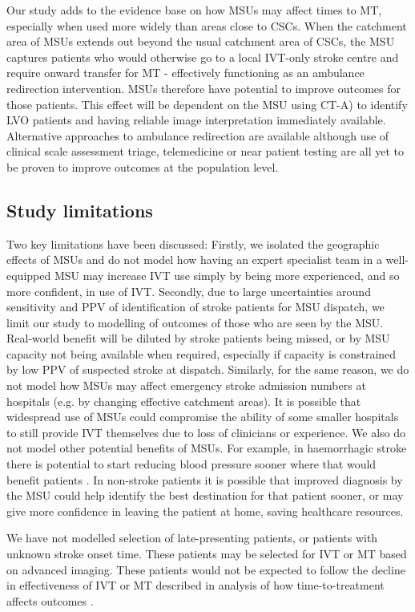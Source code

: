Our study adds to the evidence base on how MSUs may affect times to MT, especially when used more widely than areas close to CSCs. When the catchment area of MSUs extends out beyond the usual catchment area of CSCs, the MSU captures patients who would otherwise go to a local IVT-only stroke centre and require onward transfer for MT - effectively functioning as an ambulance redirection intervention. MSUs therefore have potential to improve outcomes for those patients. This effect will be dependent on the MSU using CT-A) to identify LVO patients and having reliable image interpretation immediately available. Alternative approaches to ambulance redirection are available although use of clinical scale assessment triage, telemedicine or near patient testing are all yet to be proven to improve outcomes at the population level.

\subsection{Study limitations}

Two key limitations have been discussed: Firstly, we isolated the geographic effects of MSUs and do not model how having an expert specialist team in a well-equipped MSU may increase IVT use simply by being more experienced, and so more confident, in use of IVT. Secondly, due to large uncertainties around sensitivity and PPV of identification of stroke patients for MSU dispatch, we limit our study to modelling of outcomes of those who are seen by the MSU. Real-world benefit will be diluted by stroke patients being missed, or by MSU capacity not being available when required, especially if capacity is constrained by low PPV of suspected stroke at dispatch. Similarly, for the same reason, we do not model how MSUs may affect emergency stroke admission numbers at hospitals (e.g. by changing effective catchment areas). It is possible that widespread use of MSUs could compromise the ability of some smaller hospitals to still provide IVT themselves due to loss of clinicians or experience. We also do not model other potential benefits of MSUs. For example, in haemorrhagic stroke there is potential to start reducing blood pressure sooner where that would benefit patients \cite{li_intensive_2024}. In non-stroke patients it is possible that improved diagnosis by the MSU could help identify the best destination for that patient sooner, or may give more confidence in leaving the patient at home, saving healthcare resources.

We have not modelled selection of late-presenting patients, or patients with unknown stroke onset time. These patients may be selected for IVT or MT based on advanced imaging. These patients would not be expected to follow the decline in effectiveness of IVT or MT described in analysis of how time-to-treatment affects outcomes \cite{emberson_effect_2014, fransen_time_2016}.

